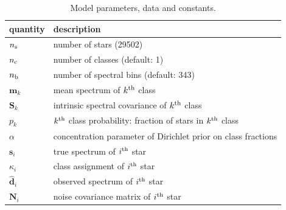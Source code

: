 \documentclass[a4paper,fleqn,usenatbib]{mnras}
\newcommand{\nb}{n_{\rm b}}
\newcommand{\nc}{n_{\rm c}}
\newcommand{\ns}{n_{\rm s}}
\newcommand{\specmean}{{\bm m}}
\newcommand{\speccov}{{\bm S}}
\newcommand{\classprob}{{p}}
\newcommand{\objspec}{{\bm s}}
\newcommand{\objclass}{{\kappa}}
\newcommand{\objdata}{\hat{\bm d}}
\newcommand{\objnoise}{{\bm N}}
\begin{document}
\begin{table}
    \centering
    \caption{Model parameters, data and constants.}
    \label{tab:params}
    \begin{tabular}{ll}
        \hline
        quantity & description \\
        \hline
        $\ns$ & number of stars (29502) \\
        $\nc$ & number of classes (default: 1) \\
        $\nb$ & number of spectral bins (default: 343) \\
        $\specmean_k$ & mean spectrum of $k^{\rm th}$ class \\
        $\speccov_k$ & intrinsic spectral covariance of $k^{\rm th}$ class \\
        $\classprob_k$ & $k^{\rm th}$ class probability: fraction of stars in $k^{\rm th}$ class \\
        $\alpha$ & concentration parameter of Dirichlet prior on class fractions \\
        $\objspec_i$ & true spectrum of $i^{\rm th}$ star \\
        $\objclass_i$ & class assignment of $i^{\rm th}$ star \\
        $\objdata_i$ & observed spectrum of $i^{\rm th}$ star \\
        $\objnoise_i$ & noise covariance matrix of $i^{\rm th}$ star \\
        \hline
    \end{tabular}
\end{table}
\end{document}
